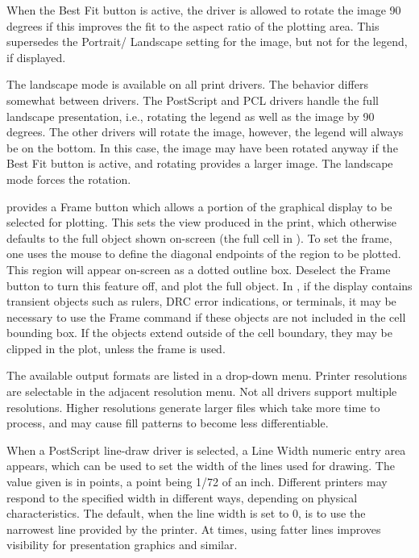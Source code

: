 When the {\cb Best Fit} button is active, the driver is allowed to
rotate the image 90 degrees if this improves the fit to the aspect
ratio of the plotting area.  This supersedes the {\cb Portrait}/{\cb
Landscape} setting for the image, but not for the legend, if
displayed.

The landscape mode is available on all print drivers.  The behavior
differs somewhat between drivers.  The PostScript and PCL drivers
handle the full landscape presentation, i.e., rotating the legend as
well as the image by 90 degrees.  The other drivers will rotate the
image, however, the legend will always be on the bottom.  In this
case, the image may have been rotated anyway if the {\cb Best Fit}
button is active, and rotating provides a larger image.  The landscape
mode forces the rotation.

{\Xic} provides a {\cb Frame} button which allows a portion of the
graphical display to be selected for plotting.  This sets the view
produced in the print, which otherwise defaults to the full object
shown on-screen (the full cell in {\Xic}).  To set the frame, one uses
the mouse to define the diagonal endpoints of the region to be
plotted.  This region will appear on-screen as a dotted outline box. 
Deselect the {\cb Frame} button to turn this feature off, and plot the
full object.  In {\Xic}, if the display contains transient objects
such as rulers, DRC error indications, or terminals, it may be
necessary to use the {\cb Frame} command if these objects are not
included in the cell bounding box.  If the objects extend outside of
the cell boundary, they may be clipped in the plot, unless the frame
is used.

The available output formats are listed in a drop-down menu.  Printer
resolutions are selectable in the adjacent resolution menu.  Not all
drivers support multiple resolutions.  Higher resolutions generate
larger files which take more time to process, and may cause fill
patterns to become less differentiable.

When a PostScript line-draw driver is selected, a {\cb Line Width}
numeric entry area appears, which can be used to set the width of the
lines used for drawing.  The value given is in points, a point being
1/72 of an inch.  Different printers may respond to the specified
width in different ways, depending on physical characteristics.  The
default, when the line width is set to 0, is to use the narrowest line
provided by the printer.  At times, using fatter lines improves
visibility for presentation graphics and similar.

